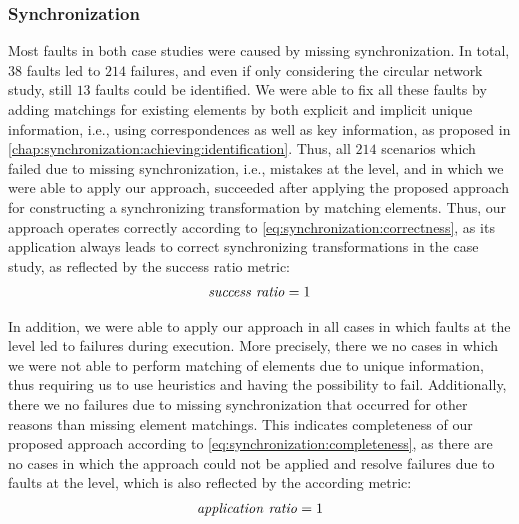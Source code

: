 

\subsubsection{Synchronization}

Most faults in both case studies were caused by missing synchronization.
In total, $38$ faults led to $214$ failures, and even if only considering the circular network study, still $13$ faults could be identified.
We were able to fix all these faults by adding matchings for existing elements by both explicit and implicit unique information, i.e., using correspondences as well as key information, as proposed in \autoref{chap:synchronization:achieving:identification}.
Thus, all $214$ scenarios which failed due to missing synchronization, i.e., mistakes at the \leveltransformation level, and in which we were able to apply our approach, succeeded after applying the proposed approach for constructing a synchronizing transformation by matching elements.
Thus, our approach operates correctly according to \autoref{eq:synchronization:correctness}, as its application always leads to correct synchronizing transformations in the case study, as reflected by the success ratio metric:
\begin{align*}
    \mathit{success\ ratio} = 1
\end{align*}

In addition, we were able to apply our approach in all cases in which faults at the \leveltransformation level led to failures during execution.
More precisely, there we no cases in which we were not able to perform matching of elements due to unique information, thus requiring us to use heuristics and having the possibility to fail.
Additionally, there we no failures due to missing synchronization that occurred for other reasons than missing element matchings.
This indicates completeness of our proposed approach according to \autoref{eq:synchronization:completeness}, as there are no cases in which the approach could not be applied and resolve failures due to faults at the \leveltransformation level, which is also reflected by the according metric:
\begin{align*}
    \mathit{application\ ratio} = 1
\end{align*}

